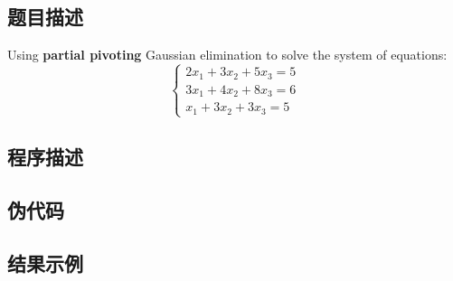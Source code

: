 \subsection{题目描述}
Using \textbf{partial pivoting} Gaussian elimination to solve the system of equations:
\[
    \begin{cases}
        2x_1 + 3x_2 + 5x_3 = 5 \\
        3x_1 + 4x_2 + 8x_3 = 6 \\
        x_1 + 3x_2 + 3x_3 = 5
    \end{cases}
\]

\subsection{程序描述}

\subsection{伪代码}

\subsection{结果示例}


